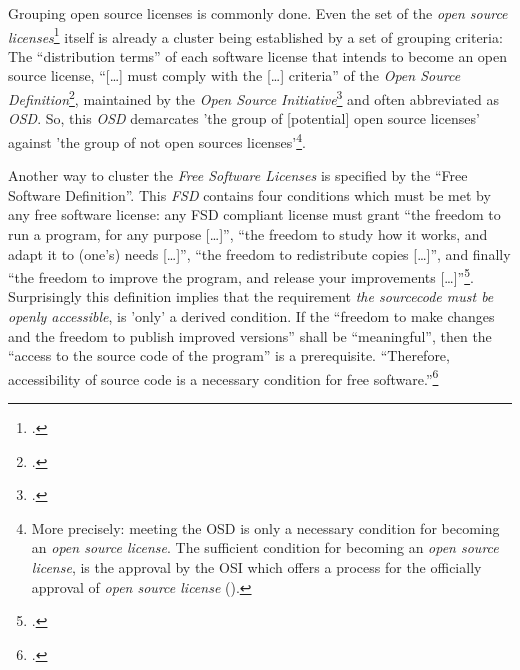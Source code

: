 Grouping open source licenses is commonly done. Even the set of the \emph{open
source li\-cen\-ses}\footcite[cf.][\nopage wp]{OSI2012b} itself is already a
cluster being established by a set of grouping criteria: The
\enquote{distribution terms} of each software license that intends to become an
open source license, \enquote{[\ldots] must comply with the [\ldots] criteria}
of the \emph{Open Source De\-fi\-ni\-tion}\footcite[cf.][\nopage wp]{OSI2012a},
maintained by the \emph{Open Source Initiative}\footcite[cf.][\nopage
wp]{OSI2012c} and often abbreviated as \emph{OSD}. So, this \emph{OSD}
demarcates 'the group of [potential] open source licenses' against 'the group of
not open sources licenses'\footnote{More precisely: meeting the
OSD is only a necessary condition for becoming an \emph{open source license}. The
sufficient condition for becoming an \emph{open source license}, is the approval
by the OSI which offers a process for the officially approval of \emph{open
source license} (\cite[cf.][\nopage wp]{OSI2012d}).}.

Another way to cluster the \emph{Free Software Licenses} is specified by the
\enquote{Free Software Definition}. This \emph{FSD} contains four conditions
which must be met by any free software license: any FSD compliant license must
grant \enquote{the freedom to run a program, for any purpose [\ldots]},
\enquote{the freedom to study how it works, and adapt it to (one's) needs
[\ldots]}, \enquote{the freedom to redistribute copies [\ldots]}, and finally
\enquote{the freedom to improve the program, and release your improvements
[\ldots]}\footcite[cf.][41]{Stallman1996a}. Surprisingly this definition
implies that the requirement \emph{the sourcecode must be openly accessible},
is 'only' a derived condition. If the \enquote{freedom to make changes and the
freedom to publish improved versions} shall be \enquote{meaningful}, then the
\enquote{access to the source code of the program} is a prerequisite.
\enquote{Therefore, accessibility of source code is a necessary condition for
free software.}\footcite[cf.][41]{Stallman1996a}

